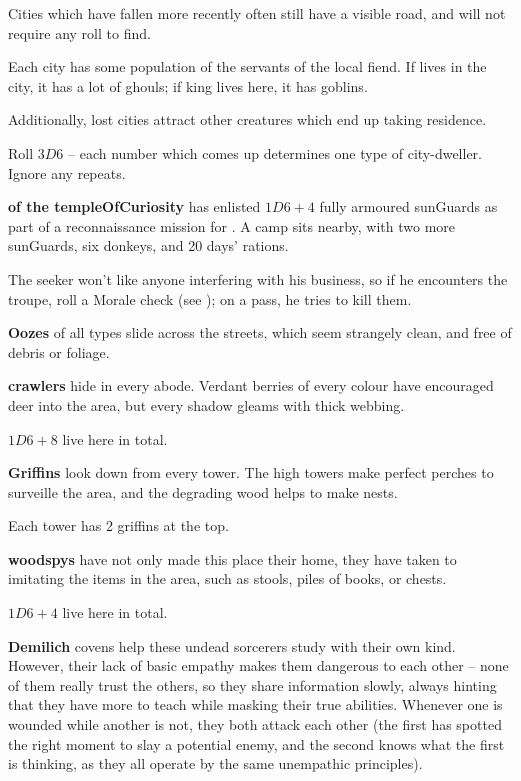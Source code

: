 \begin{multicols}{2}
Cities which have fallen more recently often still have a visible road, and will not require any roll to find.

\label{lostDwellers}

Each city has some population of the servants of the local fiend.
If  lives in the city, it has a lot of ghouls; if  king lives here, it has goblins.

Additionally, lost cities attract other creatures which end up taking residence.

Roll $3D6$ -- each number which comes up determines one type of city-dweller.
Ignore any repeats.

\begin{dlist}
  \item
  \textbf{ of the \gls{templeOfCuriosity}} has enlisted $1D6+4$ fully armoured \glspl{sunGuard} as part of a reconnaissance mission for .
  A camp sits nearby, with two more \glspl{sunGuard}, six donkeys, and 20 days' rations.

  The \gls{seeker} won't like anyone interfering with his business, so if he encounters the troupe, roll a Morale check (see ); on a pass, he tries to kill them.
  \item\label{lostOoze}
  \textbf{Oozes} of all types slide across the streets, which seem strangely clean, and free of debris or foliage.
  \item
  \textbf{\glspl{crawler}} hide in every abode.
  Verdant berries of every colour have encouraged deer into the area, but every shadow gleams with thick webbing.

  $1D6+8$ live here in total.
  \item
  \textbf{Griffins} look down from every tower.
  The high towers make perfect perches to surveille the area, and the degrading wood helps to make nests.

  Each tower has 2 griffins at the top.
  \item
  \textbf{\Glspl{woodspy}} have not only made this place their home, they have taken to imitating the items in the area, such as stools, piles of books, or chests.

  $1D6+4$ live here in total.
  \item\label{lostDemilich}
  \textbf{Demilich} covens help these undead sorcerers study with their own kind.
  However, their lack of basic empathy makes them dangerous to each other -- none of them really trust the others, so they share information slowly, always hinting that they have more to teach while masking their true abilities.
  Whenever one is wounded while another is not, they both attack each other (the first has spotted the right moment to slay a potential enemy, and the second knows what the first is thinking, as they all operate by the same unempathic principles).


\end{dlist}
\end{multicols}
